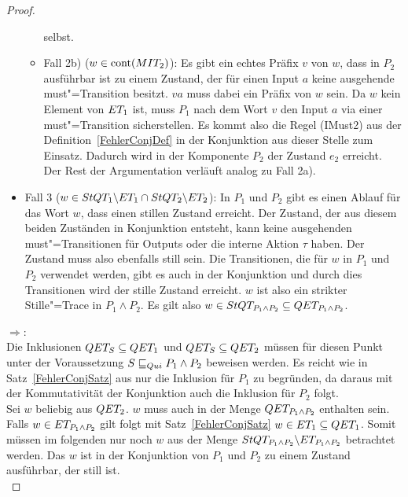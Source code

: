 \begin{proof}
\begin{itemize}
\begin{itemize}
          selbst.
        \item Fall 2b) ($w\in\mathrm{cont} (MIT _2)$): Es gibt ein echtes Präfix $v$
          von $w$, dass in $P_2$ ausführbar ist zu einem Zustand, der für einen
          Input $a$ keine ausgehende must"=Transition besitzt. $va$ muss dabei
          ein Präfix von $w$ sein. Da $w$ kein Element von $ET _1$ ist, muss
          $P_1$ nach dem Wort $v$ den Input $a$ via einer must"=Transition
          sicherstellen. Es kommt also die Regel (IMust2) aus der
          Definition~\ref{FehlerConjDef} in der Konjunktion aus dieser Stelle
          zum Einsatz. Dadurch wird in der Komponente $P_2$ der Zustand $e_2$
          erreicht. Der Rest der Argumentation verläuft analog zu Fall 2a).
      \end{itemize}
    \item Fall 3 ($w\in StQT _1\backslash ET _1\cap StQT _2\backslash ET _2$):
      In $P_1$ und $P_2$ gibt es einen Ablauf für das Wort $w$, dass einen
      stillen Zustand erreicht. Der Zustand, der aus diesem beiden Zuständen in
      Konjunktion entsteht, kann keine ausgehenden must"=Transitionen für
      Outputs oder die interne Aktion $\tau$ haben. Der Zustand muss also
      ebenfalls still sein. Die Transitionen, die für $w$ in $P_1$ und $P_2$
      verwendet werden, gibt es auch in der Konjunktion und durch dies
      Transitionen wird der stille Zustand erreicht. $w$ ist also ein strikter
      Stille"=Trace in $P_1\land P_2$. Es gilt also $w\in StQT _{P_1\land P_2}
      \subseteq QET _{P_1\land P_2}$.
  \end{itemize}

  \glqq $\Rightarrow$\grqq{}:\\
  Die Inklusionen $QET _S\subseteq QET _1$ und $QET _S\subseteq QET _2$
  müssen für diesen Punkt unter der Voraussetzung $S \sqsubseteq  _{Qui} P_1\land P_2$
  beweisen werden. Es reicht wie in Satz~\ref{FehlerConjSatz} aus nur die
  Inklusion für $P_1$ zu begründen, da daraus mit der Kommutativität der
  Konjunktion auch die Inklusion für $P_2$ folgt.\\
  Sei $w$ beliebig aus $QET _2$. $w$ muss auch in der Menge $QET _{P_1\land
  P_2}$ enthalten sein. Falls $w\in ET _{P_1\land P_2}$ gilt folgt mit
  Satz~\ref{FehlerConjSatz} $w\in ET _1\subseteq QET _1$. Somit müssen im
  folgenden nur noch $w$ aus der Menge $StQT _{P_1\land P_2}\backslash ET
  _{P_1\land P_2}$ betrachtet werden. Das $w$ ist in der Konjunktion von $P_1$
  und $P_2$ zu einem Zustand ausführbar, der still ist.
  \\ 
\end{proof}
